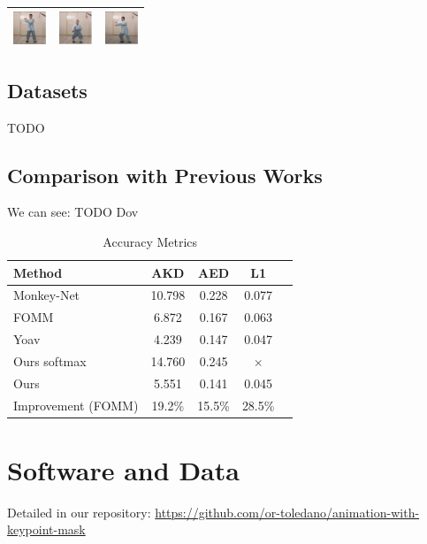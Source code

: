 \documentclass{article}
\begin{document}
\begin{tabular}{m{1.5cm}m{1.5cm}m{1.5cm}}
\includegraphics[width=1cm, height=1cm]{paper/images/4_YOAV_3.JPG}&
\includegraphics[width=1cm, height=1cm]{paper/images/4_YOAV_4.JPG}&
\includegraphics[width=1cm, height=1cm]{paper/images/4_YOAV_5.JPG}\\
\bottomrule
\end{tabular}




\subsection{Datasets}
TODO
\subsection{Comparison with Previous Works}
We can see:
\label{results}
TODO Dov

\begin{table}[t]
\caption{Accuracy Metrics}
\label{sample-table}
\vskip 0.15in
\begin{center}
\begin{small}
\begin{sc}
\begin{tabular}{lcccr}
\toprule
Method & AKD & AED & L1 \\
\midrule
Monkey-Net    & 10.798 & 0.228 & 0.077 \\
FOMM    & 6.872 & 0.167 & 0.063 \\
Yoav & 4.239 & 0.147 & 0.047 \\
Ours softmax & 14.760& 0.245 & $\times$ \\
Ours & 5.551 & 0.141 &  0.045\\
\midrule
Improvement (FOMM)    & 19.2\% & 15.5\% & 28.5\% \\
\bottomrule
\end{tabular}
\end{sc}
\end{small}
\end{center}
\vskip -0.1in
\end{table}

\section*{Software and Data}
Detailed in our repository:
{\footnotesize
\url{https://github.com/or-toledano/animation-with-keypoint-mask}
}



\end{document}
